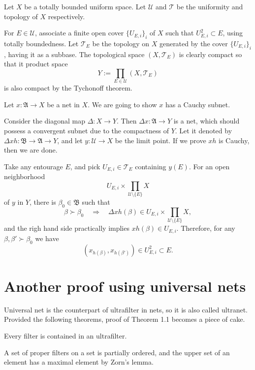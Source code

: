 \documentclass[11pt]{amsart}
\begin{document}
\begin{pf}[2 of Theorem 1.1.]
Let $X$ be a totally bounded uniform space.
Let $\mathcal{U}$ and $\mathcal{T}$ be the uniformity and topology of $X$ respectively.

For $E\in\mathcal{U}$, associate a finite open cover $\{U_{E,i}\}_i$ of $X$ such that $U_{E,i}^2\subset E$, using totally boundedness.
Let $\mathcal{T}_E$ be the topology on $X$ generated by the cover $\{U_{E,i}\}_i$, having it as a subbase.
The topological space $(X,\mathcal{T}_E)$ is clearly compact so that it product space
\[Y:=\prod_{E\in\mathcal{U}}(X,\mathcal{T}_E)\]
is also compact by the Tychonoff theorem.

Let $x:\mathfrak{A}\to X$ be a net in $X$.
We are going to show $x$ has a Cauchy subnet.

Consider the diagonal map $\Delta:X\to Y$.
Then $\Delta x:\mathfrak{A}\to Y$ is a net, which should possess a convergent subnet due to the compactness of $Y$.
Let it denoted by $\Delta xh:\mathfrak{B}\to\mathfrak{A}\to Y$, and let $y:\mathcal{U}\to X$ be the limit point.
If we prove $xh$ is Cauchy, then we are done.

Take any entourage $E$, and pick $U_{E,i}\in\mathcal{T}_E$ containing $y(E)$.
For an open neighborhood
\[U_{E,i}\times\prod_{\mathcal{U}\setminus\{E\}}X\]
of $y$ in $Y$, there is $\beta_0\in\mathfrak{B}$ such that
\[\beta\succ\beta_0\quad\Rightarrow\quad\Delta xh(\beta)\in U_{E,i}\times\prod_{\mathcal{U}\setminus\{E\}}X,\]
and the righ hand side practically implies $xh(\beta)\in U_{E,i}$.
Therefore, for any $\beta,\beta'\succ\beta_0$ we have
\[(x_{h(\beta)},x_{h(\beta')})\in U_{E,i}^2\subset E.\]
\end{pf}


\section{Another proof using universal nets}

Universal net is the counterpart of ultrafilter in nets, so it is also called ultranet.
Provided the following theorems, proof of Theorem 1.1 becomes a piece of cake.

\begin{thm}
Every filter is contained in an ultrafilter.
\end{thm}
\begin{pf}
A set of proper filters on a set is partially ordered, and the upper set of an element has a maximal element by Zorn's lemma.
\end{pf}
\end{document}
